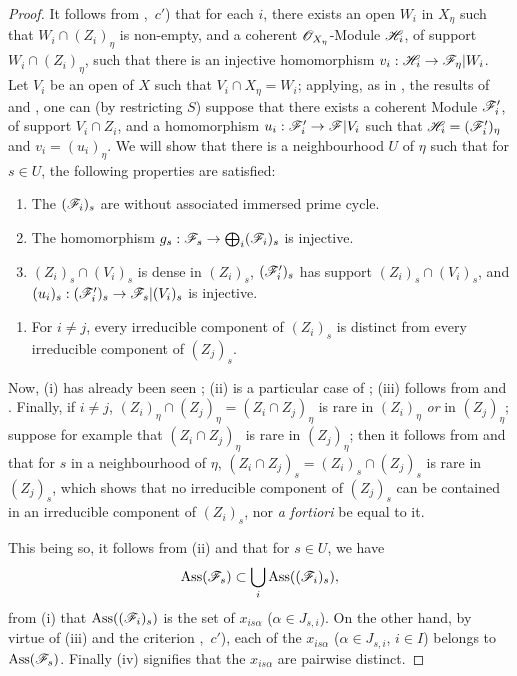 \begin{proof}
\label{IV.9.8.3-proof}
It follows from ,~$c'$) that for each $i$, there exists an open $W_i$ in $X_\eta$ such that $W_i\cap(Z_i)_\eta$ is non-empty, and a coherent $\mathscr{O}_{X_\eta}$-Module $\mathscr{H}_i$, of support $W_i\cap(Z_i)_\eta$, such that there is an injective homomorphism $v_i:\mathscr{H}_i\to\mathscr{F}_\eta|W_i$.
Let $V_i$ be an open of $X$ such that $V_i\cap X_\eta=W_i$; applying, as in , the results of  and , one can (by restricting $S$) suppose that there exists a coherent Module $\mathscr{F}'_i$, of support $V_i\cap Z_i$, and a homomorphism $u_i:\mathscr{F}'_i\to\mathscr{F}|V_i$ such that $\mathscr{H}_i=(\mathscr{F}'_i)_\eta$ and $v_i=(u_i)_\eta$.
We will show that there is a neighbourhood $U$ of $\eta$ such that for $s\in U$, the following properties are satisfied:
\begin{enumerate}[label=(\roman*)]
  \item The $(\mathscr{F}_i)_s$ are without associated immersed prime cycle.
  \item The homomorphism $g_s:\mathscr{F}_s\to\bigoplus_i(\mathscr{F}_i)_s$ is injective.
  \item $(Z_i)_s\cap(V_i)_s$ is dense in $(Z_i)_s$, $(\mathscr{F}'_i)_s$ has support $(Z_i)_s\cap(V_i)_s$, and $(u_i)_s:(\mathscr{F}'_i)_s\to\mathscr{F}_s|(V_i)_s$ is injective.
\end{enumerate}

\begin{enumerate}[label=(\roman*)]
  \item[(iv)] For $i\neq j$, every irreducible component of $(Z_i)_s$ is distinct from every irreducible component of $(Z_j)_s$.
\end{enumerate}

Now, (i) has already been seen ; (ii) is a particular case of ; (iii) follows from  and .
Finally, if $i\neq j$, $(Z_i)_\eta\cap(Z_j)_\eta=(Z_i\cap Z_j)_\eta$ is rare in $(Z_i)_\eta$ \emph{or} in $(Z_j)_\eta$; suppose for example that $(Z_i\cap Z_j)_\eta$ is rare in $(Z_j)_\eta$; then it follows from  and  that for $s$ in a neighbourhood of $\eta$, $(Z_i\cap Z_j)_s=(Z_i)_s\cap(Z_j)_s$ is rare in $(Z_j)_s$, which shows that no irreducible component of $(Z_j)_s$ can be contained in an irreducible component of $(Z_i)_s$, nor \emph{a fortiori} be equal to it.

This being so, it follows from (ii) and  that for $s\in U$, we have
\[
  \operatorname{Ass}(\mathscr{F}_s)\subset\bigcup_i\operatorname{Ass}((\mathscr{F}_i)_s),
\]
from (i) that $\operatorname{Ass}((\mathscr{F}_i)_s)$ is the set of $x_{is\alpha}$ ($\alpha\in J_{s,i}$).
On the other hand, by virtue of (iii) and the criterion ,~$c'$), each of the $x_{is\alpha}$ ($\alpha\in J_{s,i}$, $i\in I$) belongs to $\operatorname{Ass}(\mathscr{F}_s)$.
Finally (iv) signifies that the $x_{is\alpha}$ are pairwise distinct.


\end{proof}
